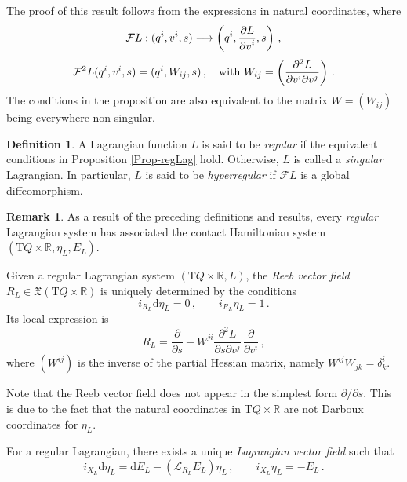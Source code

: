 \documentclass[11pt]{article}
\theoremstyle{plain}
\theoremstyle{definition}
\newtheorem{definition}[theorem]{Definition}
\newtheorem{remark}[theorem]{Remark}
\newcommand{\R}{\mathbb{R}}
\renewcommand{\d}{\mathrm{d}}
\newcommand{\T}{{\mathrm T}}
\newcommand{\Lie}{\mathscr{L}}
\newcommand{\X}{\mathfrak{X}}
\newcommand{\F}{\mathcal{F}}
\def\d{\mathrm{d}}
\def\X{\mathfrak{X}}
\def\d{\mathrm{d}}
\def\Lie{\mathscr{L}}
\begin{document}
The proof of this result follows from the expressions in natural coordinates, where
$$
{\cal F}L:(q^i,v^i, s)  \longrightarrow  \left(q^i,
\frac{\displaystyle\partial L}{\displaystyle\partial v^i}, s
\right)\,,
$$
$$
{\cal F}^2 L(q^i,v^i,s) = (q^i,W_{ij},s)
\,,\quad
\hbox{with}\ 
W_{ij} = 
\left( \frac{\partial^2L}{\partial v^i\partial v^j}\right)
\,.
$$
The conditions in the proposition are also equivalent to the matrix 
$W= (W_{ij})$ 
being everywhere non-singular.

\begin{definition}
A Lagrangian function $L$ is said to be {\sl regular} if the equivalent
conditions in Proposition \ref{Prop-regLag} hold.
Otherwise, $L$ is called a {\sl singular} Lagrangian.
In particular, 
$L$ is said to be {\sl hyperregular} 
if $\F L$ is a global diffeomorphism.
\end{definition}

\begin{remark}
As a result of the preceding definitions and results,
every {\sl regular} Lagrangian system 
has associated the contact Hamiltonian system
$(\T Q\times\R, \eta_L, E_L)$.
\end{remark}

Given a regular Lagrangian system $(\T Q\times\R,L)$, the {\sl Reeb vector field} $R_L\in\X(\T Q\times\R)$ is uniquely determined by the conditions
\begin{equation}\label{eq:reeb}
    i_{R_L}\d\eta_L=0\,,\qquad i_{R_L}\eta_L=1 \,.
\end{equation}
Its local expression is
\begin{equation}
\label{coorReeb}
R_L=\frac{\partial}{\partial s}-W^{ji}\frac{\partial^2L}{\partial s \partial v^j}\,\frac{\partial}{\partial v^i} \,,
\end{equation}
where $(W^{ij})$ is the inverse of the partial Hessian matrix,
namely 
$W^{ij} W_{jk} = \delta^i_{k}$.

Note that the Reeb vector field does not appear
in the simplest form $\partial/\partial s$.
This is due to the fact that the natural coordinates in $\T Q \times \R$
are not Darboux coordinates for $\eta_L$.

For a regular Lagrangian, there exists a unique \textsl{Lagrangian vector field} such that
\begin{equation}\label{contact_EL}
        i_{X_L} \d \eta_L = \d E_L -( \Lie_{R_L} E_L ) \eta_L \,,\qquad
    i_{X_L} \eta_L = - E_L \,.
\end{equation}
\end{document}
